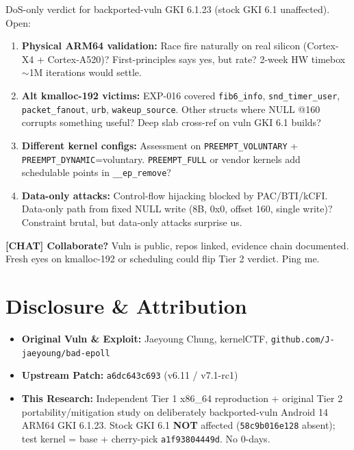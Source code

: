 \documentclass[11pt,a4paper]{article}
\begin{document}
DoS-only verdict for backported-vuln GKI 6.1.23 (stock GKI 6.1 unaffected). Open:

\begin{enumerate}
  \item \textbf{Physical ARM64 validation:} Race fire naturally on real silicon (Cortex-X4 + Cortex-A520)? First-principles says yes, but rate? 2-week HW timebox $\sim$1M iterations would settle.
  \item \textbf{Alt kmalloc-192 victims:} EXP-016 covered \texttt{fib6\_info}, \texttt{snd\_timer\_user}, \texttt{packet\_fanout}, \texttt{urb}, \texttt{wakeup\_source}. Other structs where NULL @160 corrupts something useful? Deep slab cross-ref on vuln GKI 6.1 builds?
  \item \textbf{Different kernel configs:} Assessment on \texttt{PREEMPT\_VOLUNTARY} + \texttt{PREEMPT\_DYNAMIC}=voluntary. \texttt{PREEMPT\_FULL} or vendor kernels add schedulable points in \texttt{\_\_ep\_remove}?
  \item \textbf{Data-only attacks:} Control-flow hijacking blocked by PAC/BTI/kCFI. Data-only path from fixed NULL write (8B, 0x0, offset 160, single write)? Constraint brutal, but data-only attacks surprise us.
\end{enumerate}

\begin{pullquote}
\noindent\textbf{[CHAT] Collaborate?} Vuln is public, repos linked, evidence chain documented. Fresh eyes on kmalloc-192 or scheduling could flip Tier 2 verdict. Ping me.
\end{pullquote}

\newpage

\section{Disclosure \& Attribution}

\begin{itemize}
  \item \textbf{Original Vuln \& Exploit:} Jaeyoung Chung, kernelCTF, \texttt{github.com/J-jaeyoung/bad-epoll}
  \item \textbf{Upstream Patch:} \texttt{a6dc643c693} (v6.11 / v7.1-rc1)
  \item \textbf{This Research:} Independent Tier 1 x86\_64 reproduction + original Tier 2 portability/mitigation study on deliberately backported-vuln Android 14 ARM64 GKI 6.1.23. Stock GKI 6.1 \textbf{NOT} affected (\texttt{58c9b016e128} absent); test kernel = base + cherry-pick \texttt{a1f93804449d}. No 0-days.
\end{itemize}
\end{document}
